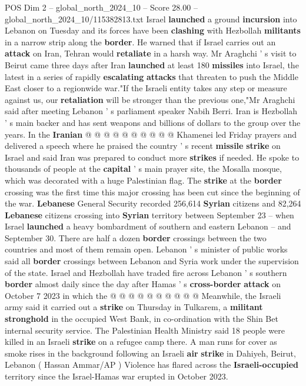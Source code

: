 \begin{textsample}{POS Dim 2 – global\_north\_2024\_10 – Score 28.00 – global\_north\_2024\_10/115382813.txt}
Israel \textbf{launched} a ground \textbf{incursion} into Lebanon on Tuesday and its forces have been \textbf{clashing} with Hezbollah \textbf{militants} in a narrow strip along the \textbf{border}.
He warned that if Israel carries out an \textbf{attack} on Iran, Tehran would \textbf{retaliate} in a harsh way.
Mr Araghchi ' s visit to Beirut came three days after Iran \textbf{launched} at least 180 \textbf{missiles} into Israel, the latest in a series of rapidly \textbf{escalating} \textbf{attacks} that threaten to push the Middle East closer to a regionwide war."If the Israeli entity takes any step or measure against us, our \textbf{retaliation} will be stronger than the previous one,"Mr Araghchi said after meeting Lebanon ' s parliament speaker Nabih Berri.
Iran is Hezbollah ' s main backer and has sent weapons and billions of dollars to the group over the years.
In the \textbf{Iranian} @ @ @ @ @ @ @ @ @ @ Khamenei led Friday prayers and delivered a speech where he praised the country ' s recent \textbf{missile} \textbf{strike} on Israel and said Iran was prepared to conduct more \textbf{strikes} if needed.
He spoke to thousands of people at the \textbf{capital} ' s main prayer site, the Mosalla mosque, which was decorated with a huge Palestinian flag.
The \textbf{strike} at the \textbf{border} crossing was the first time this major crossing has been cut since the beginning of the war. \textbf{Lebanese} General Security recorded 256,614 \textbf{Syrian} citizens and 82,264 \textbf{Lebanese} citizens crossing into \textbf{Syrian} territory between September 23 -- when Israel \textbf{launched} a heavy bombardment of southern and eastern Lebanon -- and September 30.
There are half a dozen \textbf{border} crossings between the two countries and most of them remain open.
Lebanon ' s minister of public works said all \textbf{border} crossings between Lebanon and Syria work under the supervision of the state.
Israel and Hezbollah have traded fire across Lebanon ' s southern \textbf{border} almost daily since the day after Hamas ' s \textbf{cross-border} \textbf{attack} on October 7 2023 in which the @ @ @ @ @ @ @ @ @ @ Meanwhile, the Israeli army said it carried out a \textbf{strike} on Thursday in Tulkarem, a \textbf{militant} \textbf{stronghold} in the occupied West Bank, in co-ordination with the Shin Bet internal security service.
The Palestinian Health Ministry said 18 people were killed in an Israeli \textbf{strike} on a refugee camp there.
A man runs for cover as smoke rises in the background following an Israeli \textbf{air} \textbf{strike} in Dahiyeh, Beirut, Lebanon ( Hassan Ammar/AP ) Violence has flared across the \textbf{Israeli-occupied} territory since the Israel-Hamas war erupted in October 2023.

\end{textsample}
